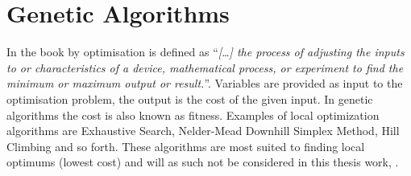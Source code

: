 


\section{Genetic Algorithms}
\label{GeneticAlgorithm}
In the book  by \cite[][2]{Haupt2004} optimisation is defined as ``\textit{[\dots] the process of adjusting the inputs to or characteristics of a device, mathematical process, or experiment to find the minimum or maximum output or result.}''. Variables are provided as input to the optimisation problem, the output is the cost of the given input. In genetic algorithms the cost is also known as fitness. Examples of local optimization algorithms are Exhaustive Search, Nelder-Mead Downhill Simplex Method, Hill Climbing and so forth. These algorithms are most suited to finding local optimums (lowest cost) and will as such not be considered in this thesis work, \parencite{Haupt2004}.

